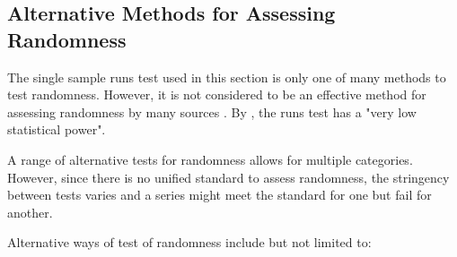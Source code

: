 \documentclass[12pt]{article}
\theoremstyle{plain}
\theoremstyle{definition}
\theoremstyle{remark}
\begin{document}
\subsection{Alternative Methods for Assessing Randomness}
The single sample runs test used in this section is only one of many methods to test randomness. However, it is not considered to be an effective method for assessing randomness by many sources \cite{3.4}. By \cite{3.8}, the runs test has a "very low statistical power".

A range of alternative tests for randomness allows for multiple categories. However, since there is no unified standard to assess randomness, the stringency between tests varies and a series might meet the standard for one but fail for another. \cite{3.4}

Alternative ways of test of randomness include but not limited to: 
\end{document}
